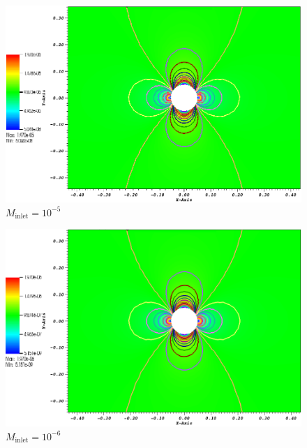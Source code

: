         \begin{figure}[H]
                \centering
                \includegraphics[width=\textwidth]{figures/CylinderMach1em5ZoomIn.png}
                \caption{$M_{\text{inlet}}=10^{-5}$}
                \label{fig:cyl_1em5}
        \end{figure}

        \begin{figure}[H]
                \centering
                \includegraphics[width=\textwidth]{figures/CylinderMach1em6ZoomIn.png}
                \caption{$M_{\text{inlet}}=10^{-6}$}
                \label{fig:cyl_1em6}
        \end{figure}

